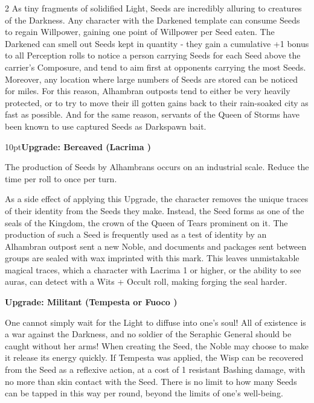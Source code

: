 \begin{multicols}{2}
As tiny fragments of solidified Light, Seeds are incredibly alluring to creatures of the Darkness. Any character with the Darkened template can consume Seeds to regain Willpower, gaining one point of Willpower per Seed eaten. The Darkened can smell out Seeds kept in quantity - they gain a cumulative +1 bonus to all Perception rolls to notice a person carrying Seeds for each Seed above the carrier's Composure, and tend to aim first at opponents carrying the most Seeds. Moreover, any location where large numbers of Seeds are stored can be noticed for miles. For this reason, Alhambran outposts tend to either be very heavily protected, or to try to move their ill gotten gains back to their rain-soaked city as fast as possible. And for the same reason, servants of the Queen of Storms have been known to use captured Seeds as Darkspawn bait.

\begin{myindentpar}{10pt}\textbf{Upgrade: Bereaved (Lacrima \textbullet\textbullet\textbullet)}

The production of Seeds by Alhambrans occurs on an industrial scale. Reduce the time per roll to once per turn. 

As a side effect of applying this Upgrade, the character removes the unique traces of their identity from the Seeds they make. Instead, the Seed forms as one of the seals of the Kingdom, the crown of the Queen of Tears prominent on it. The production of such a Seed is frequently used as a test of identity by an Alhambran outpost sent a new Noble, and documents and packages sent between groups are sealed with wax imprinted with this mark. This leaves unmistakable magical traces, which a character with Lacrima 1 or higher, or the ability to see auras, can detect with a Wits + Occult roll, making forging the seal harder.

\textbf{Upgrade: Militant (Tempesta \textbullet\textbullet or Fuoco \textbullet\textbullet\textbullet)}

One cannot simply wait for the Light to diffuse into one's soul! All of existence is a war against the Darkness, and no soldier of the Seraphic General should be caught without her arms! When creating the Seed, the Noble may choose to make it release its energy quickly. If Tempesta was applied, the Wisp can be recovered from the Seed as a reflexive action, at a cost of 1 resistant Bashing  damage, with no more than skin contact with the Seed. There is no limit to how many Seeds can be tapped in this way per round, beyond the limits of one's well-being.


\end{myindentpar}
\end{multicols}
